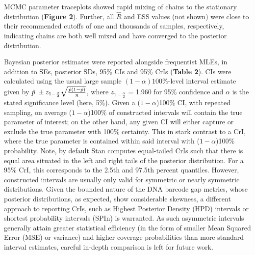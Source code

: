 \documentclass[12pt]{article}
\begin{document}
MCMC parameter traceplots showed rapid mixing of chains to the stationary distribution (\textbf{Figure 2}). Further, all $\hat{R}$ and ESS values (not shown) were close to their recommended cutoffs of one and thousands of samples, respectively, indicating chains are both well mixed and have converged to the posterior distribution.  

Bayesian posterior estimates were reported alongside frequentist MLEs, in addition to SEs, posterior SDs, 95\% CIs and 95\% CrIs (\textbf{Table 2}). CIs were calculated using the usual large sample  $(1-\alpha)100\%$-level interval estimate given by $\hat{p} \hspace{1mm} \pm z_{1 - \frac{\alpha}{2}}\sqrt{\frac{\hat{p}(1 - \hat{p})}{n}}$, where $z_{1 - \frac{\alpha}{2}}$ = 1.960 for 95\% confidence and $\alpha$ is the stated significance level (here, 5\%). Given a ($1 - \alpha$)100\% CI, with repeated sampling, on average ($1 - \alpha$)100\% of constructed intervals will contain the true parameter of interest; on the other hand, any given CI will either capture or exclude the true parameter with 100\% certainty. This in stark contrast to a CrI, where the true parameter is contained within said interval with ($1 - \alpha$)100\% probability. Note, by default Stan computes equal-tailed CrIs such that there is equal area situated in the left and right tails of the posterior distribution. For a 95\% CrI, this corresponds to the 2.5th and 97.5th percent quantiles. However, constructed intervals are usually only valid for symmetric or nearly symmetric distributions. Given the bounded nature of the DNA barcode gap metrics, whose posterior distributions, as expected, show considerable skewness, a different approach to reporting CrIs, such as Highest Posterior Density (HPD) intervals \citep{chen1999monte} or shortest probability intervals (SPIn) \citep{liu2015simulation} is warranted. As such asymmetric intervals generally attain greater statistical efficiency (in the form of smaller Mean Squared Error (MSE) or variance) and higher coverage probabilities than more standard interval estimates, careful in-depth comparison is left for future work. 
\end{document}
